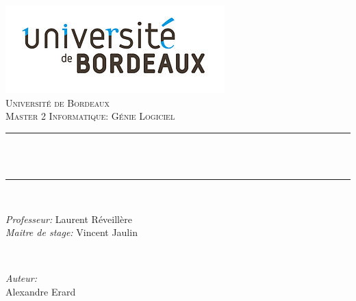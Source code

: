 \begin{titlepage}
	\centering
    \vspace*{0.5 cm}
    \includegraphics[scale = 1]{assets/logo_ub.jpg}\\[1.0 cm]	%
    \textsc{\LARGE \newline\newline Université de Bordeaux}\\[2.0 cm]	%
	\textsc{\Large Master 2 Informatique: Génie Logiciel}\\[0.5 cm]				%
	\rule{\linewidth}{0.2 mm} \\[0.4 cm]
	{ \huge \bfseries \thetitle}\\
	\rule{\linewidth}{0.2 mm} \\[1.5 cm]
	
	\begin{minipage}{0.5\textwidth}
		\begin{flushleft} \large
			\emph{Professeur:}
			Laurent Réveillère\\
			\emph{Maitre de stage:}
            Vincent Jaulin\\
			\end{flushleft}
			\end{minipage}~
			\begin{minipage}{0.4\textwidth}
            
			\begin{flushright} \large
                \emph{Auteur:}\\
			Alexandre Erard\\
		\end{flushright}
        
	\end{minipage}\\[2 cm]
	
	
    \thedate
\end{titlepage}


